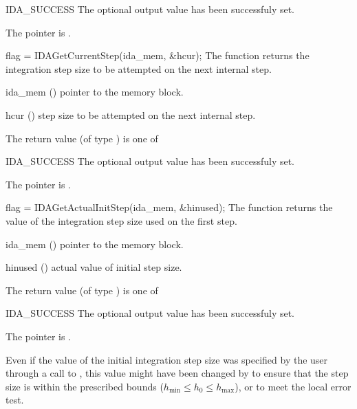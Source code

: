 {{\begin{args}
  \item[IDA\_SUCCESS] 
    The optional output value has been successfuly set.
  \item[\Id{IDA\_MEM\_NULL}]
    The  pointer is .
  \end{args}
}
{}
{
  flag = IDAGetCurrentStep(ida\_mem, \&hcur);
}
{
  The function  returns the
  integration step size to be attempted on the next internal step.
}
{
  \begin{args}
  \item[ida\_mem] ()
    pointer to the {\ida} memory block.
  \item[hcur] ()
    step size to be attempted on the next internal step.
  \end{args}
}
{
  The return value  (of type ) is one of
  \begin{args}
  \item[IDA\_SUCCESS] 
    The optional output value has been successfuly set.
  \item[\Id{IDA\_MEM\_NULL}]
    The  pointer is .
  \end{args}
}
{}
{
  flag = IDAGetActualInitStep(ida\_mem, \&hinused);
}
{
  The function  returns the
  value of the integration step size used on the first step.
}
{
  \begin{args}
  \item[ida\_mem] ()
    pointer to the {\ida} memory block.
  \item[hinused] ()
    actual value of initial step size.
  \end{args}
}
{
  The return value  (of type ) is one of
  \begin{args}
  \item[IDA\_SUCCESS] 
    The optional output value has been successfuly set.
  \item[\Id{IDA\_MEM\_NULL}]
    The  pointer is .
  \end{args}
}
{
  Even if the value of the initial integration step size was specified
  by the user through a call to , this value might have 
  been changed by {\ida} to ensure that the step size is within the 
  prescribed bounds ($h_{\min} \le h_0 \le h_{\max}$), or to meet the
  local error test.
}
}
